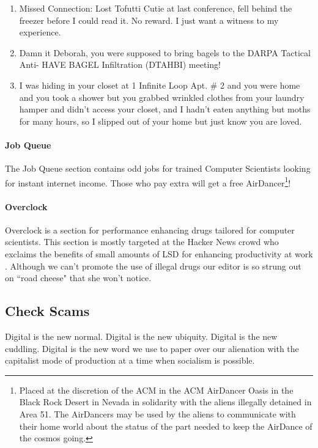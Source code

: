 \begin{enumerate}
  \item Missed Connection: Lost Tofutti Cutie at last conference, fell behind the freezer before I could read it. No reward. I just want a witness to my experience.

  \item Damn it Deborah, you were supposed to bring bagels to the DARPA
Tactical Anti- HAVE BAGEL Infiltration 
(DTAHBI) meeting!

  \item I was hiding in your closet at 1 Infinite Loop Apt. \# 2 and you were home and you took a shower but you grabbed wrinkled clothes from your laundry hamper and didn't access your closet, and I hadn't eaten anything but moths for many hours, so I slipped out of your home but just know you are loved.
\end{enumerate}

\paragraph{Job Queue}
The Job Queue section contains odd jobs for trained Computer Scientists looking
for instant internet income.
Those who pay extra will get a free AirDancer\footnote{Placed at the discretion
of the ACM in the ACM AirDancer Oasis in the Black Rock Desert in Nevada in
solidarity with the aliens illegally detained in Area 51. The AirDancers may
be used by the aliens to communicate with their home world about the status of the part needed to keep the AirDance of the cosmos going.}!




\paragraph{Overclock}
Overclock is a section for performance enhancing drugs tailored for computer
scientists.
This section is mostly targeted at the Hacker News \cite{hn} crowd who exclaims
the benefits of small amounts of LSD for enhancing productivity at work
\cite{microdose, lsd-song}.
Although we can't promote the use of illegal drugs our editor is so strung out
on ``road cheese" that she won't notice.

\subsection{Check Scams}
\iffalse
Digital is the new normal. Digital is the new ubiquity. Digital is the new cuddling. Digital is the new word we use to paper over our alienation with the capitalist mode of production at a time when socialism is possible.

